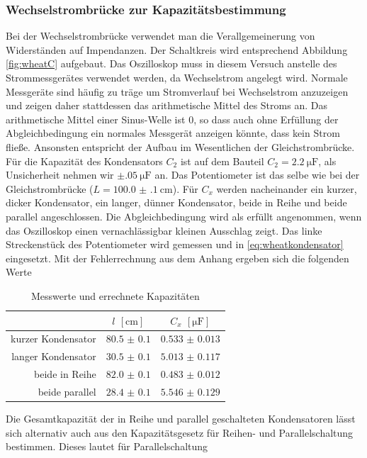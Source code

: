 \subsubsection{Wechselstrombrücke zur Kapazitätsbestimmung}
Bei der Wechselstrombrücke verwendet man die Verallgemeinerung von Widerständen auf Impendanzen. Der Schaltkreis wird entsprechend Abbildung \ref{fig:wheatC} aufgebaut. Das Oszilloskop muss in diesem Versuch anstelle des Strommessgerätes verwendet werden, da Wechselstrom angelegt wird. Normale Messgeräte sind häufig zu träge um Stromverlauf bei Wechselstrom anzuzeigen und zeigen daher stattdessen das arithmetische Mittel des Stroms an. Das arithmetische Mittel einer Sinus-Welle ist $ 0 $, so dass auch ohne Erfüllung der Abgleichbedingung ein normales Messgerät anzeigen könnte, dass kein Strom fließe. Ansonsten entspricht der Aufbau im Wesentlichen der Gleichstrombrücke. Für die Kapazität des Kondensators $ C_2 $ ist auf dem Bauteil $ C_2 = \SI{2.2}{\micro\farad} $, als Unsicherheit nehmen wir $ \pm \SI{.05}{\micro\farad} $ an. Das Potentiometer ist das selbe wie bei der Gleichstrombrücke ($ L = \SI{100.0(1)}{\centi\meter} $). Für $ C_x $ werden nacheinander ein kurzer, dicker Kondensator, ein langer, dünner Kondensator, beide in Reihe und beide parallel angeschlossen. Die Abgleichbedingung wird als erfüllt angenommen, wenn das Oszilloskop einen vernachlässigbar kleinen Ausschlag zeigt. Das linke Streckenstück des Potentiometer wird gemessen und in \eqref{eq:wheatkondensator} eingesetzt. Mit der Fehlerrechnung aus dem Anhang ergeben sich die folgenden Werte
\begin{table}[H]
	\centering
	\begin{tabular}{r|cc}
		 & $ l $ $ [\si{\centi\meter}] $ & $ C_x $ $ [\si{\micro\farad}] $ \\\hline
		 kurzer Kondensator & $ \num{80.5(01)} $ & $ \num{0.533(0013)} $\\
		 langer Kondensator & $ \num{30.5(01)} $ & $ \num{5.013(0117)} $\\
		 beide in Reihe & $ \num{82.0(01)} $ & $ \num{0.483(0012)} $\\
		 beide parallel & $ \num{28.4(01)} $ & $ \num{5.546(0129)} $\\
	\end{tabular}
	\caption{Messwerte und errechnete Kapazitäten}
\end{table}
Die Gesamtkapazität der in Reihe und parallel geschalteten Kondensatoren lässt sich alternativ auch aus den Kapazitätsgesetz für Reihen- und Parallelschaltung bestimmen. Dieses lautet für Parallelschaltung
